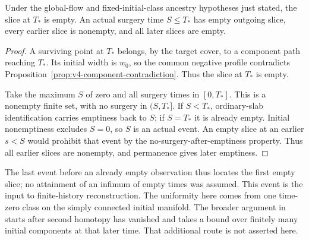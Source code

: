 \begin{theorem}
\label{prop:v4-global-extinction}
Under the global-flow and fixed-initial-class ancestry hypotheses just
stated, the slice at $T_*$ is empty. An actual surgery time $S\leq T_*$
has empty outgoing slice, every earlier slice is nonempty, and all later
slices are empty.
\end{theorem}
\begin{proof}
A surviving point at $T_*$ belongs, by the target cover, to a component
path reaching $T_*$. Its initial width is $w_0$, so the common negative
profile contradicts Proposition~\ref{prop:v4-component-contradiction}.
Thus the slice at $T_*$ is empty.

Take the maximum $S$ of zero and all surgery times in $[0,T_*]$.
This is a nonempty finite set, with no surgery in $(S,T_*]$.
If $S<T_*$, ordinary-slab identification carries emptiness back to
$S$; if $S=T_*$ it is already empty. Initial nonemptiness excludes
$S=0$, so $S$ is an actual event. An empty slice at an earlier $s<S$
would prohibit that event by the no-surgery-after-emptiness property.
Thus all earlier slices are nonempty, and permanence gives later emptiness.
\end{proof}

The last event before an already empty observation thus locates the first
empty slice; no attainment of an infimum of empty times was assumed.
This event is the input to finite-history reconstruction. The uniformity
here comes from one time-zero class on the simply connected initial
manifold. The broader argument in \cite[pp. 431--432]{MT2007} starts after
second homotopy has vanished and takes a bound over finitely many initial
components at that later time. That additional route is not asserted here.
